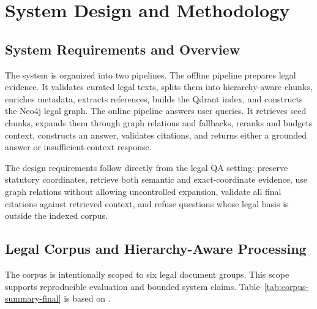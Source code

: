 \section{System Design and Methodology}

\subsection{System Requirements and Overview}
The system is organized into two pipelines. The offline pipeline prepares legal evidence. It validates curated legal texts, splits them into hierarchy-aware chunks, enriches metadata, extracts references, builds the Qdrant index, and constructs the Neo4j legal graph. The online pipeline answers user queries. It retrieves seed chunks, expands them through graph relations and fallbacks, reranks and budgets context, constructs an answer, validates citations, and returns either a grounded answer or insufficient-context response.


The design requirements follow directly from the legal QA setting: preserve statutory coordinates, retrieve both semantic and exact-coordinate evidence, use graph relations without allowing uncontrolled expansion, validate all final citations against retrieved context, and refuse questions whose legal basis is outside the indexed corpus.

\subsection{Legal Corpus and Hierarchy-Aware Processing}
The corpus is intentionally scoped to six legal document groups. This scope supports reproducible evaluation and bounded system claims. Table~\ref{tab:corpus-summary-final} is based on .

